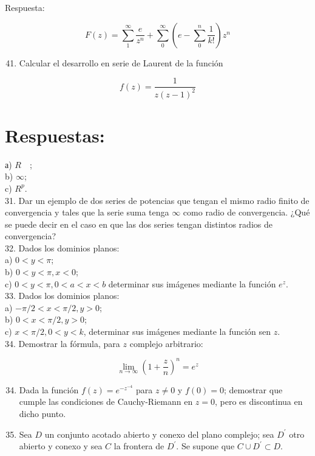\documentclass[10pt]{article}
\theoremstyle{plain}
\theoremstyle{definition}
\theoremstyle{remark}
\begin{document}
Respuesta:

$$
F(z)=\sum_{1}^{\infty} \frac{e}{z^{n}}+\sum_{0}^{\infty}\left(e-\sum_{0}^{n} \frac{1}{k!}\right) z^{n}
$$

\begin{enumerate}
  \setcounter{enumi}{40}
  \item Calcular el desarrollo en serie de Laurent de la función
\end{enumerate}

$$
f(z)=\frac{1}{z(z-1)^{2}}
$$

\section*{Respuestas:}
а) $R \quad$;\\
b) $\infty$;\\
c) $R^{p}$.\\
31. Dar un ejemplo de dos series de potencias que tengan el mismo radio finito de convergencia y tales que la serie suma tenga $\infty$ como radio de convergencia. ¿Qué se puede decir en el caso en que las dos series tengan distintos radios de convergencia?\\
32. Dados los dominios planos:\\
a) $0<y<\pi$;\\
b) $0<y<\pi, x<0$;\\
c) $0<y<\pi, 0<a<x<b$ determinar sus imágenes mediante la función $e^{z}$.\\
33. Dados los dominios planos:\\
a) $-\pi / 2<x<\pi / 2, y>0$;\\
b) $0<x<\pi / 2, y>0$;\\
c) $x<\pi / 2,0<y<k$, determinar sus imágenes mediante la función sen $z$.\\
34. Demostrar la fórmula, para $z$ complejo arbitrario:

$$
\lim _{n \rightarrow \infty}\left(1+\frac{z}{n}\right)^{n}=e^{z}
$$

\begin{enumerate}
  \setcounter{enumi}{33}
  \item Dada la función $f(z)=e^{-z^{-4}}$ para $z \neq 0$ y $f(0)=0$; demostrar que cumple las condiciones de Cauchy-Riemann en $z=0$, pero es discontinua en dicho punto.
  \item Sea $D$ un conjunto acotado abierto y conexo del plano complejo; sea $D^{\prime}$ otro abierto y conexo y sea $C$ la frontera de $D^{\prime}$. Se supone que $C \cup D^{\prime} \subset D$.
\end{enumerate}
\end{document}
